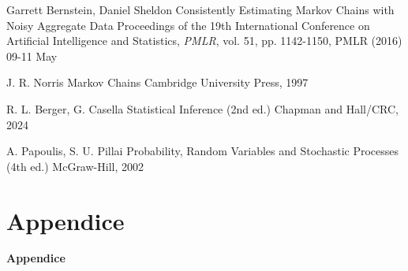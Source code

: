\documentclass[10pt,xcolor={table,dvipsnames}]{beamer} 		%
\theoremstyle{plain}					%
\theoremstyle{definition}
\theoremstyle{remark}
\begin{document}
	\begin{frame}{\refname}
		\begin{thebibliography}{9}
			 Garrett Bernstein, Daniel Sheldon
			\newblock Consistently Estimating Markov Chains with Noisy Aggregate Data
			\newblock Proceedings of the 19th International Conference on Artificial Intelligence and Statistics, \emph{PMLR}, vol. 51, pp. 1142-1150, PMLR (2016) 09-11 May

			 J. R. Norris
			\newblock Markov Chains
			\newblock Cambridge University Press, 1997

			 R. L. Berger, G. Casella
			\newblock Statistical Inference (2nd ed.)
			\newblock Chapman and Hall/CRC, 2024

			 A. Papoulis, S. U. Pillai
			\newblock Probability, Random Variables and Stochastic Processes (4th ed.)
			\newblock McGraw-Hill, 2002
		\end{thebibliography}
	\end{frame}

\appendix

\section*{Appendice}
	\begin{frame}
		\begin{center}
			\Huge{\textbf{Appendice}}
		\end{center}
	\end{frame}
\end{document}
